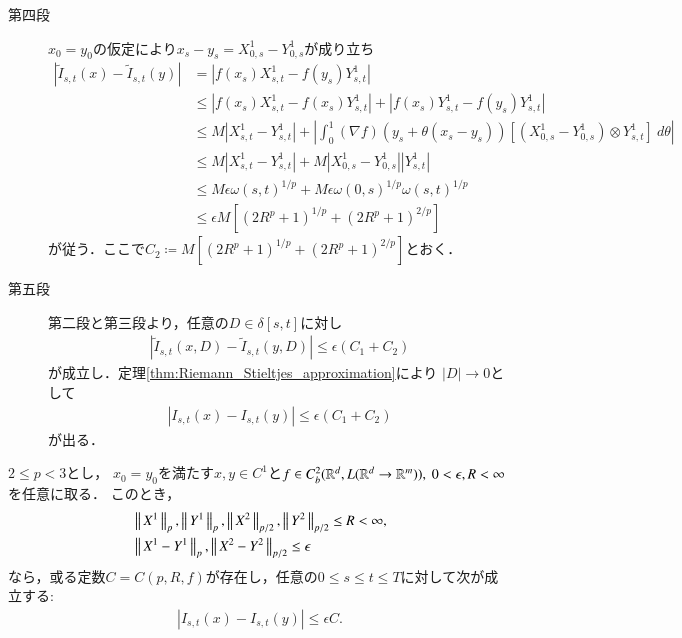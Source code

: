 \begin{prf}
\begin{description}
			\item[第四段]
				$x_0 = y_0$の仮定により$x_s-y_s = X^1_{0,s} - Y^1_{0,s}$が成り立ち
				\begin{align}
					\left| \tilde{I}_{s,t}(x) - \tilde{I}_{s,t}(y) \right|
					&= \left| f(x_s)X^1_{s,t} - f(y_s)Y^1_{s,t} \right| \\
					&\leq \left| f(x_s)X^1_{s,t} - f(x_s)Y^1_{s,t} \right|
						+ \left| f(x_s)Y^1_{s,t} - f(y_s)Y^1_{s,t} \right| \\
					&\leq M \left| X^1_{s,t} - Y^1_{s,t} \right|
						+ \left| \int_0^1 (\nabla f)(y_s + \theta(x_s - y_s)) \left[ \left( X^1_{0,s} - Y^1_{0,s}\right) \otimes Y^1_{s,t} \right]\ d\theta \right| \\
					&\leq M \left| X^1_{s,t} - Y^1_{s,t} \right|
						+ M \left| X^1_{0,s} - Y^1_{0,s}\right| \left| Y^1_{s,t} \right| \\
					&\leq M \epsilon \omega(s,t)^{1/p} + M \epsilon \omega(0,s)^{1/p} \omega(s,t)^{1/p} \\
					&\leq \epsilon M\left[\left( 2 R^p + 1 \right)^{1/p} + \left( 2 R^p + 1 \right)^{2/p} \right]
				\end{align}
				が従う．ここで$C_2 \coloneqq M\left[\left( 2 R^p + 1 \right)^{1/p} + \left( 2 R^p + 1 \right)^{2/p} \right]$とおく．
				
			\item[第五段]
				第二段と第三段より，任意の$D \in \delta[s,t]$に対し
				\begin{align}
					\left| \tilde{I}_{s,t}(x,D) - \tilde{I}_{s,t}(y,D) \right|
					\leq \epsilon (C_1 + C_2)
				\end{align}
				が成立し．定理\ref{thm:Riemann_Stieltjes_approximation}により
				$|D| \longrightarrow 0$として
				\begin{align}
					\left| I_{s,t}(x) - I_{s,t}(y) \right|
					\leq \epsilon (C_1 + C_2)
				\end{align}
				が出る．
				\QED
		\end{description}
	\end{prf}
	
	\begin{screen}
		\begin{thm}\label{thm:continuity_theorem_2}
			$2 \leq p < 3$とし，
			$x_0 = y_0$を満たす$x,y \in C^1$と$f \in C^2_b(\mathbb{R}^d,L(\mathbb{R}^d \rightarrow \mathbb{R}^m)),\ 0 < \epsilon, R < \infty$を任意に取る．
			このとき，
			\begin{align}
				&\left\|\, X^1\, \right\|_{p},\left\|\, Y^1\, \right\|_{p},\left\|\, X^2\, \right\|_{p/2},\left\|\, Y^2\, \right\|_{p/2} \leq R < \infty,\\
				&\left\|\, X^1 - Y^1\, \right\|_{p},\left\|\, X^2 - Y^2\, \right\|_{p/2} \leq \epsilon
			\end{align}
			なら，或る定数$C = C(p,R,f)$が存在し，任意の$0 \leq s \leq t \leq T$に対して次が成立する:
			\begin{align}
				\left| I_{s,t}(x) - I_{s,t}(y) \right| \leq \epsilon C.
			\end{align}
		\end{thm}
	\end{screen}
	
